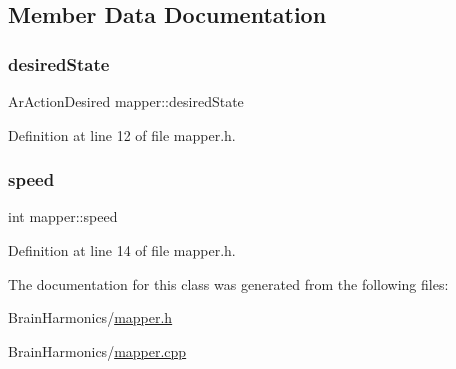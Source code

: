 \subsection{Member Data Documentation}
\mbox{\label{classmapper_ad12cf719b7ef6c4399ca718cdc9f270d}} 
\subsubsection{\texorpdfstring{desired\+State}{desiredState}}
{\footnotesize\ttfamily Ar\+Action\+Desired mapper\+::desired\+State}



Definition at line 12 of file mapper.\+h.

\mbox{\label{classmapper_a2764f9fead6392132485f3545c18b629}} 
\subsubsection{\texorpdfstring{speed}{speed}}
{\footnotesize\ttfamily int mapper\+::speed\hspace{0.3cm}{\ttfamily [protected]}}



Definition at line 14 of file mapper.\+h.



The documentation for this class was generated from the following files\+:\begin{DoxyCompactItemize}
\item 
Brain\+Harmonics/\hyperlink{mapper_8h}{mapper.\+h}\item 
Brain\+Harmonics/\hyperlink{mapper_8cpp}{mapper.\+cpp}\end{DoxyCompactItemize}
